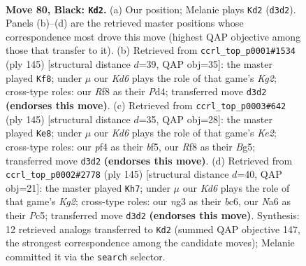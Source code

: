 \documentclass[11pt]{article}
\begin{document}
\clearpage

\begin{figure}[p]\centering
\begin{subfigure}{0.46\textwidth}\centering
\resizebox{\linewidth}{!}{%
\newchessgame
\chessboard[
  setfen={5r2/5p2/n5p1/3BP2p/b4Pp1/3k2N1/5K1P/8 b - - 19 80},
  showmover=false,
  pgfstyle=straightmove, color=movearrow, markmove={d3-d2}
]}
\caption{}
\end{subfigure}\hfill
\begin{subfigure}{0.46\textwidth}\centering
\resizebox{\linewidth}{!}{%
\newchessgame
\chessboard[
  setfen={8/1p3pk1/p7/P1N3pP/1P1p4/5K2/8/8 b - - 3 73},
  showmover=false,
  pgfstyle=straightmove, color=movearrow, markmove={g7-f8}
]}
\caption{}
\end{subfigure}
\\[4pt]
\begin{subfigure}{0.46\textwidth}\centering
\resizebox{\linewidth}{!}{%
\newchessgame
\chessboard[
  setfen={8/1p2k3/2p5/2PpNBb1/3P4/r7/2K2p1P/1R6 b - - 3 73},
  showmover=false,
  pgfstyle=straightmove, color=movearrow, markmove={e7-e8}
]}
\caption{}
\end{subfigure}\hfill
\begin{subfigure}{0.46\textwidth}\centering
\resizebox{\linewidth}{!}{%
\newchessgame
\chessboard[
  setfen={8/6k1/2B3p1/2p1pp1p/2P1p2P/6P1/4K3/8 b - - 29 73},
  showmover=false,
  pgfstyle=straightmove, color=movearrow, markmove={g7-h7}
]}
\caption{}
\end{subfigure}
\caption{\textbf{Move 80, Black: \texttt{Kd2}.} (a) Our position; Melanie plays \texttt{Kd2} (\texttt{d3d2}). Panels (b)--(d) are the retrieved master positions whose correspondence most drove this move (highest QAP objective among those that transfer to it). (b) Retrieved from \texttt{ccrl\_top\_p0001\#1534} (ply 145) [structural distance $d$=39, QAP obj=35]: the master played \texttt{Kf8}; under $\mu$ our \emph{Kd6} plays the role of that game's \emph{Kg2}; cross-type roles: our \emph{R}f8 as their \emph{P}d4; transferred move \texttt{d3d2} \textbf{(endorses this move)}. (c) Retrieved from \texttt{ccrl\_top\_p0003\#642} (ply 145) [structural distance $d$=35, QAP obj=28]: the master played \texttt{Ke8}; under $\mu$ our \emph{Kd6} plays the role of that game's \emph{Ke2}; cross-type roles: our \emph{p}f4 as their \emph{b}f5, our \emph{R}f8 as their \emph{B}g5; transferred move \texttt{d3d2} \textbf{(endorses this move)}. (d) Retrieved from \texttt{ccrl\_top\_p0002\#2778} (ply 145) [structural distance $d$=40, QAP obj=21]: the master played \texttt{Kh7}; under $\mu$ our \emph{Kd6} plays the role of that game's \emph{Kg2}; cross-type roles: our \emph{n}g3 as their \emph{b}c6, our \emph{N}a6 as their \emph{P}c5; transferred move \texttt{d3d2} \textbf{(endorses this move)}. Synthesis: 12 retrieved analogs transferred to \texttt{Kd2} (summed QAP objective 147, the strongest correspondence among the candidate moves); Melanie committed it via the \texttt{search} selector.}
\label{fig:thought-m159}
\end{figure}
\end{document}
